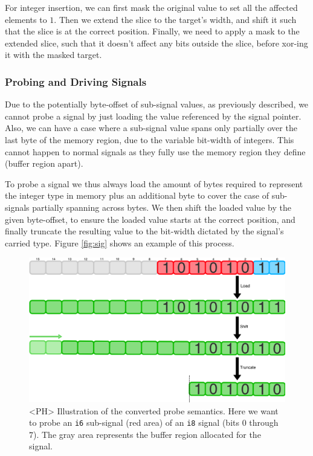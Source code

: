 For integer insertion, we can first mask the original value to set all the affected elements to $1$. Then we extend the slice to the target's width, and shift it such that the slice is at the correct position. Finally, we need to apply a mask to the extended slice, such that it doesn't affect any bits outside the slice, before xor-ing it with the masked target.



\subsubsection{Probing and Driving Signals}
Due to the potentially byte-offset of sub-signal values, as previously described, we cannot probe a signal by just loading the value referenced by the signal pointer. Also, we can have a case where a sub-signal value spans only partially over the last byte of the memory region, due to the variable bit-width of integers. This cannot happen to normal signals as they fully use the memory region they define (buffer region apart).

To probe a signal we thus always load the amount of bytes required to represent the integer type in memory plus an additional byte to cover the case of sub-signals partially spanning across bytes. We then shift the loaded value by the given byte-offset, to ensure the loaded value starts at the correct position, and finally truncate the resulting value to the bit-width dictated by the signal's carried type. Figure \ref{fig:sig} shows an example of this process.

\begin{figure}[ht]
    \includegraphics[width=\textwidth]{gfx/Probe.png}
    \caption[<PH> Illustration of the converted probe semantics.]{<PH> Illustration of the converted probe semantics. Here we want to probe an \texttt{i6} sub-signal (red area) of an \texttt{i8} signal (bits $0$
        through $7$). The gray area represents the buffer region allocated for the signal.}
    \label{fig:prb}
\end{figure}

